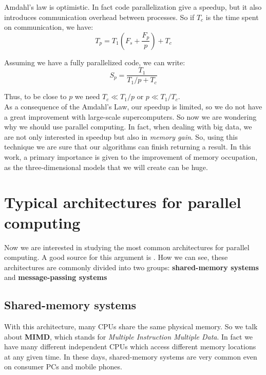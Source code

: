 Amdahl's law is optimistic. In fact code parallelization give a speedup, but it also introduces communication overhead between processes. So if $T_{c}$ is the time spent on communication, we have:
\begin{equation}
 T_{p} = T_{1}(F_{s} + \displaystyle\frac{F_{p}}{p}) +  T_{c}
\end{equation}

Assuming we have a fully parallelized code, we can write:
\begin{equation}
 S_{p} = \displaystyle\frac{T_{1}}{T_{1}/p + T_{c}}
\end{equation}

Thus, to be close to $p$ we need $T_{c} \ll T_{1}/p$ or $p \ll T_{1}/T_{c}$.\\

As a consequence of the Amdahl's Law, our speedup is limited, so we do not have a great improvement with large-scale supercomputers. So now we are wondering why we should use parallel computing. In fact, when dealing with big data, we are not only interested in speedup but also in \textit{memory gain}. So, using this technique we are sure that our algorithms can finish returning a result. In this work, a primary importance is given to the improvement of memory occupation, as the three-dimensional models that we will create can be huge.

\section{Typical architectures for parallel computing}\label{sec22:parallelArchitectures}

Now we are interested in studying the most common architectures for parallel computing. A good source for this argument is \cite{Matloff}. How we can see, these architectures are commonly divided into two groups: \textbf{shared-memory systems} and \textbf{message-passing systems}

\subsection{Shared-memory systems}

With this architecture, many CPUs share the same physical memory. So we talk about \textbf{MIMD}, which stands for \textit{Multiple Instruction Multiple Data}. In fact we have many different independent CPUs which access different memory locations at any given time. In these days, shared-memory systems are very common even on consumer PCs and mobile phones.\\

